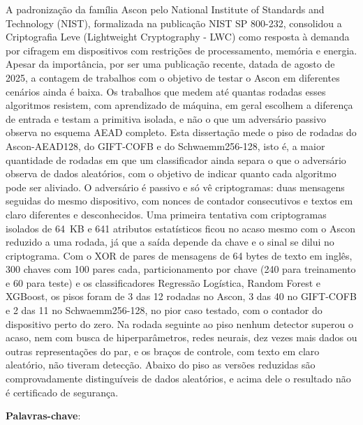 \setlength{\absparsep}{18pt} %
\begin{resumo}
\SingleSpacing
A padronização da família Ascon pelo National Institute of Standards and Technology (NIST), formalizada na publicação NIST SP 800-232, consolidou a Criptografia Leve (Lightweight Cryptography - LWC) como resposta à demanda por cifragem em dispositivos com restrições de processamento, memória e energia. Apesar da importância, por ser uma publicação recente, datada de agosto de 2025, a contagem de trabalhos com o objetivo de testar o Ascon em diferentes cenários ainda é baixa. Os trabalhos que medem até quantas rodadas esses algoritmos resistem, com aprendizado de máquina, em geral escolhem a diferença de entrada e testam a primitiva isolada, e não o que um adversário passivo observa no esquema AEAD completo. Esta dissertação mede o piso de rodadas do Ascon-AEAD128, do GIFT-COFB e do Schwaemm256-128, isto é, a maior quantidade de rodadas em que um classificador ainda separa o que o adversário observa de dados aleatórios, com o objetivo de indicar quanto cada algoritmo pode ser aliviado. O adversário é passivo e só vê criptogramas: duas mensagens seguidas do mesmo dispositivo, com nonces de contador consecutivos e textos em claro diferentes e desconhecidos. Uma primeira tentativa com criptogramas isolados de 64~KB e 641 atributos estatísticos ficou no acaso mesmo com o Ascon reduzido a uma rodada, já que a saída depende da chave e o sinal se dilui no criptograma. Com o XOR de pares de mensagens de 64 bytes de texto em inglês, 300 chaves com 100 pares cada, particionamento por chave (240 para treinamento e 60 para teste) e os classificadores Regressão Logística, Random Forest e XGBoost, os pisos foram de 3 das 12 rodadas no Ascon, 3 das 40 no GIFT-COFB e 2 das 11 no Schwaemm256-128, no pior caso testado, com o contador do dispositivo perto do zero. Na rodada seguinte ao piso nenhum detector superou o acaso, nem com busca de hiperparâmetros, redes neurais, dez vezes mais dados ou outras representações do par, e os braços de controle, com texto em claro aleatório, não tiveram detecção. Abaixo do piso as versões reduzidas são comprovadamente distinguíveis de dados aleatórios, e acima dele o resultado não é certificado de segurança.

 \textbf{Palavras-chave}: \imprimirpalavraschave
\end{resumo}

